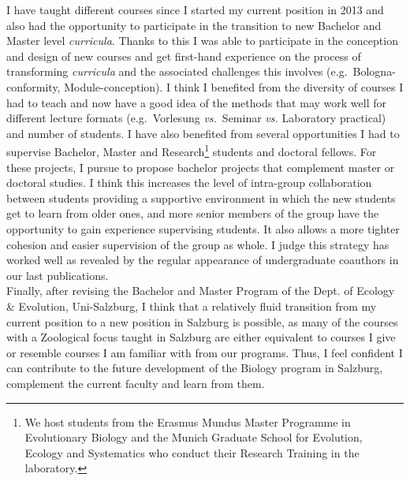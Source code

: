 \documentclass[a4paper,11pt]{article}
\begin{document}
I have taught different courses since I started my current position in 2013 and also had the opportunity to participate in the transition to new Bachelor and Master level \emph{curricula}. Thanks to this I was able to participate in the conception and design of new courses and get first-hand experience on the process of transforming \emph{curricula} and the associated challenges this involves (e.g.~Bologna-conformity, Module-conception). I think I benefited from the diversity of courses I had to teach and now have a good idea of the methods that may work well for different lecture formats (e.g.~Vorlesung \emph{vs.}~Seminar \emph{vs.} Laboratory practical) and number of students. I have also benefited from several opportunities I had to supervise Bachelor, Master and Research\footnote{We host students from the Erasmus Mundus Master Programme in Evolutionary Biology and the Munich Graduate School for Evolution, Ecology and Systematics who conduct their Research Training in the laboratory.} students and doctoral fellows. For these projects, I pursue to propose bachelor projects that complement master or doctoral studies. I think this increases the level of intra-group collaboration between students providing a supportive environment in which the new students get to learn from older ones, and more senior members of the group have the opportunity to gain experience supervising students. It also allows a more tighter cohesion and easier supervision of the group as whole. I judge this strategy has worked well as revealed by the regular appearance of undergraduate coauthors in our last publications.\\

Finally, after revising the Bachelor and Master Program of the Dept. of Ecology \& Evolution, Uni-Salzburg, I think that a relatively fluid transition from my current position to a new position in Salzburg is possible, as many of the courses with a Zoological focus taught in Salzburg are either equivalent to courses I give or resemble courses I am familiar with from our programs. Thus, I feel confident I can contribute to the future development of the Biology program in Salzburg, complement the current faculty and learn from them.




\end{document}
